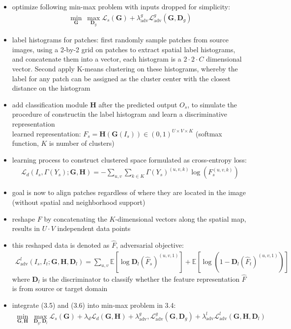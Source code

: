 \documentclass[]{article}
\begin{document}
\begin{itemize}
	\item optimize following min-max problem with inputs dropped for simplicity:
	\begin{align}
		\underset{\mathbf{G}}{\min} ~ \underset{\mathbf{D}_g}{\max} \mathcal{L}_s(\mathbf{G}) + \lambda_{\text{adv}}^g \mathcal{L}_{\text{adv}}^g(\mathbf{G}, \mathbf{D}_g)
	\end{align}
	\item label histograms for patches: first randomly sample patches from source images, using a 2-by-2 grid on patches to extract spatial label histograms, and concatenate them into a vector, each histogram is a $2 \cdot 2 \cdot C$ dimensional vector. Second apply K-means clustering on these histograms, whereby the label for any patch can be assigned as the cluster center with the closest distance on the histogram
	\item add classification module $\mathbf{H}$ after the predicted output $O_s$, to simulate the procedure of constructin the label histogram and learn a discriminative representation\\
	learned representation: $F_s = \mathbf{H}(\mathbf{G}(I_s)) \in (0,1)^{U \times V \times K}$ (softmax function, $K$ is number of clusters)
	\item learning process to construct clustered space formulated as cross-entropy loss:
	\begin{align}
		\mathcal{L}_d(I_s, \Gamma(Y_s); \mathbf{G}, \mathbf{H}) = - \sum_{u,v} \sum_{k\in K} \Gamma(Y_s)^{(u,v,k)}\log(F_s^{(u,v,k)})
	\end{align}
	\item goal is now to align patches regardless of where they are located in the image (without spatial and neighborhood support)
	\item reshape $F$ by concatenating the $K$-dimensional vectors along the spatial map, results in $U \cdot V$ independent data points
	\item this reshaped data is denoted as $\hat{F}$, adversarial objective:
	\begin{align}
		\mathcal{L}_{\text{adv}}^l(I_s, I_t; \mathbf{G}, \mathbf{H}, \mathbf{D}_l) = \sum_{u,v}\mathbb{E}[\log \mathbf{D}_l(\hat{F}_s)^{(u,v,1)}] + \mathbb{E} [\log(1- \mathbf{D}_l(\hat{F}_t)^{(u,v,1)})]
	\end{align}
	where $\mathbf{D}_l$ is the discriminator to classify whether the feature representation $\hat{F}$ is from source or target domain
	\item integrate (3.5) and (3.6) into min-max problem in 3.4:
	\begin{align}
		\underset{\mathbf{G}, \mathbf{H}}{\min} ~ \underset{\mathbf{D}_g, \mathbf{D}_l}{\max} \mathcal{L}_s(\mathbf{G}) + \lambda_d \mathcal{L}_d (\mathbf{G}, \mathbf{H}) + \lambda_{\text{adv}}^g, \mathcal{L}_{\text{adv}}^g(\mathbf{G}, \mathbf{D}_g) + \lambda_{\text{adv}}^l \mathcal{L}_{\text{adv}}^l(\mathbf{G}, \mathbf{H}, \mathbf{D}_l)
	\end{align} 
\end{itemize}
\end{document}
